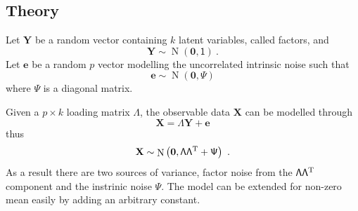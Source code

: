 \documentclass[12pt]{report}
\DeclareMathOperator{\normal}{N}
\newcommand{\T}{^\textup{T}}
\newcommand{\vect}[1]{\mathbf{#1}}
\newcommand{\matr}[1]{\mathsf{#1}}
\begin{document}
\subsection{Theory}
Let $\vect{Y}$ be a random vector containing $k$ latent variables, called factors, and
\begin{equation}
\vect{Y}\sim\normal\left(\vect{0},\matr{1}\right) \ .
\end{equation}
Let $\vect{e}$ be a random $p$ vector modelling the uncorrelated intrinsic noise such that
\begin{equation}
\vect{e}\sim\normal\left(\vect{0},\matr{\Psi}\right)
\end{equation}
where $\matr{\Psi}$ is a diagonal matrix.

Given a $p\times k$ loading matrix $\matr{\Lambda}$, the observable data $\vect{X}$ can be modelled through
\begin{equation}
\vect{X}=\matr{\Lambda}\vect{Y}+\vect{e}
\end{equation}
thus
\begin{equation}
\vect{X}\sim\normal\left(\vect{0},\matr{\Lambda}\matr{\Lambda}\T+\matr{\Psi}\right) \ .
\end{equation}
As a result there are two sources of variance, factor noise from the $\matr{\Lambda}\matr{\Lambda}\T$ component and the instrinic noise $\matr{\Psi}$. The model can be extended for non-zero mean easily by adding an arbitrary constant.
\end{document}

